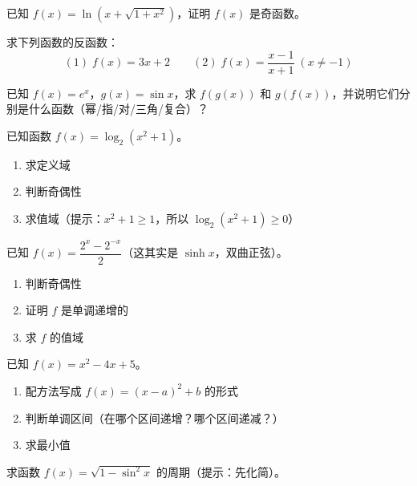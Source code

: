 \begin{exercise}[3]
已知 \(f(x) = \ln(x + \sqrt{1 + x^2})\)，证明 \(f(x)\) 是奇函数。
\end{exercise}

\begin{exercise}[3]
求下列函数的反函数：
\[
(1)\; f(x) = 3x + 2 \qquad (2)\; f(x) = \frac{x - 1}{x + 1} \;(x \neq -1)
\]
\end{exercise}

\begin{exercise}[3]
已知 \(f(x) = e^x\)，\(g(x) = \sin x\)，求 \(f(g(x))\) 和 \(g(f(x))\)，并说明它们分别是什么函数（幂/指/对/三角/复合）？
\end{exercise}

\begin{exercise}[3]
已知函数 \(f(x) = \log_2 (x^2 + 1)\)。
\begin{enumerate}
  \item[(1)] 求定义域
  \item[(2)] 判断奇偶性
  \item[(3)] 求值域（提示：\(x^2 + 1 \ge 1\)，所以 \(\log_2(x^2+1) \ge 0\)）
\end{enumerate}
\end{exercise}


\begin{exercise}[4]
已知 \(f(x) = \dfrac{2^x - 2^{-x}}{2}\)（这其实是 \(\sinh x\)，双曲正弦）。
\begin{enumerate}
  \item[(1)] 判断奇偶性
  \item[(2)] 证明 \(f\) 是单调递增的
  \item[(3)] 求 \(f\) 的值域
\end{enumerate}
\end{exercise}

\begin{exercise}[4]
已知 \(f(x) = x^2 - 4x + 5\)。
\begin{enumerate}
  \item[(1)] 配方法写成 \(f(x) = (x - a)^2 + b\) 的形式
  \item[(2)] 判断单调区间（在哪个区间递增？哪个区间递减？）
  \item[(3)] 求最小值
\end{enumerate}
\end{exercise}

\begin{exercise}[4]
求函数 \(f(x) = \sqrt{1 - \sin^2 x}\) 的周期（提示：先化简）。
\end{exercise}

